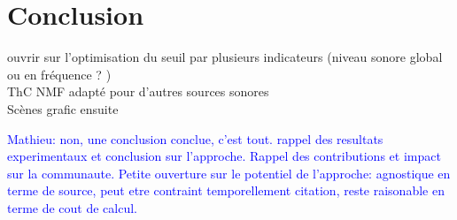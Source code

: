 \documentclass[twocolumn,a4paper,10pt]{article}
\newcommand{\ml}[1]{\textcolor{blue}{ Mathieu: #1}}
\begin{document}
\section{Conclusion}
ouvrir sur l'optimisation du seuil par plusieurs indicateurs (niveau sonore global ou en fréquence ? )\\
ThC NMF adapté pour d'autres sources sonores \\
Scènes grafic ensuite

\ml{non, une conclusion conclue, c'est tout.
rappel des resultats experimentaux et conclusion sur l'approche. Rappel des contributions et impact sur la communaute.
Petite ouverture sur le potentiel de l'approche: agnostique en terme de source, peut etre contraint temporellement citation, reste raisonable en terme de cout de calcul. }

\footnotesize


\end{document}

